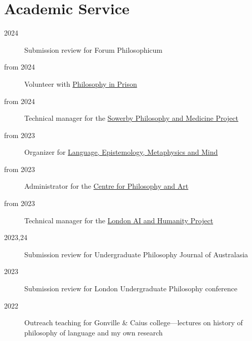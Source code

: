 \documentclass{cv}
\begin{document}
\section*{Academic Service}
\begin{description}
\item[{2024}] Submission review for Forum Philosophicum
\item[{from 2024}] Volunteer with \href{https://www.philosophyinprison.com/}{Philosophy in Prison}
\item[{from 2024}] Technical manager for the \href{https://www.philosophyandmedicine.org/}{Sowerby Philosophy and
Medicine Project}
\item[{from 2023}] Organizer for \href{https://www.lemm-london.co.uk/}{Language, Epistemology, Metaphysics and Mind}
\item[{from 2023}] Administrator for the \href{https://philosophyarts.co.uk/}{Centre for Philosophy and Art}
\item[{from 2023}] Technical manager for the \href{https://www.ai-humanity-london.com/}{London AI and Humanity Project}
\item[{2023,24}] Submission review for Undergraduate Philosophy
  Journal of Australasia
\item[{2023}] Submission review for London Undergraduate Philosophy
conference
\item[{2022}] Outreach teaching for Gonville \& Caius college---lectures on
history of philosophy of language and my own research
\end{description}
\end{document}
